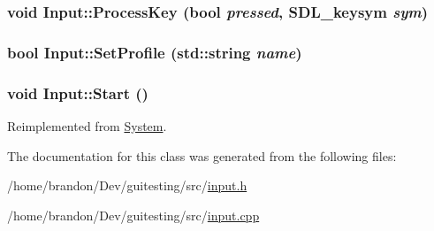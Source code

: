 \hypertarget{class_input_d975a574f8ecb71a429d9cbeeecd12fd}{
\subsubsection[{ProcessKey}]{\setlength{\rightskip}{0pt plus 5cm}void Input::ProcessKey (bool {\em pressed}, \/  SDL\_\-keysym {\em sym})}}
\label{class_input_d975a574f8ecb71a429d9cbeeecd12fd}


\hypertarget{class_input_f1470cec71424b0e82d2ebd01efb9528}{
\subsubsection[{SetProfile}]{\setlength{\rightskip}{0pt plus 5cm}bool Input::SetProfile (std::string {\em name})}}
\label{class_input_f1470cec71424b0e82d2ebd01efb9528}


\hypertarget{class_input_1808108d296e25985cfd442d8a2c9d12}{
\subsubsection[{Start}]{\setlength{\rightskip}{0pt plus 5cm}void Input::Start ()}}
\label{class_input_1808108d296e25985cfd442d8a2c9d12}




Reimplemented from \hyperlink{class_system_99d3c3036a58c1698f286677c4ace286}{System}.

The documentation for this class was generated from the following files:\begin{CompactItemize}
\item 
/home/brandon/Dev/guitesting/src/\hyperlink{input_8h}{input.h}\item 
/home/brandon/Dev/guitesting/src/\hyperlink{input_8cpp}{input.cpp}\end{CompactItemize}
